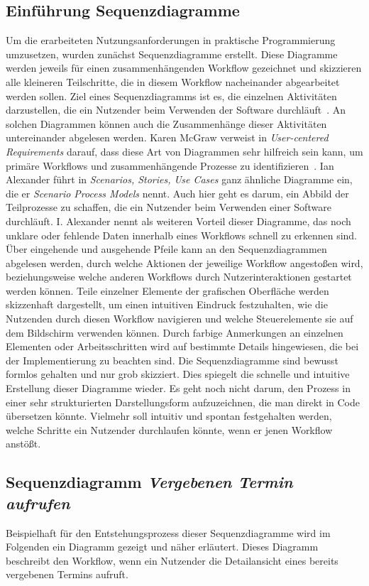 \subsection*{Einführung Sequenzdiagramme}
Um die erarbeiteten Nutzungsanforderungen in praktische Programmierung
umzusetzen, wurden zunächst Sequenzdiagramme erstellt. Diese Diagramme werden
jeweils für einen zusammenhängenden Workflow gezeichnet und skizzieren alle
kleineren Teilschritte, die in diesem Workflow nacheinander abgearbeitet werden
sollen. Ziel eines Sequenzdiagramms ist es, die einzelnen Aktivitäten
darzustellen, die ein Nutzender beim Verwenden der Software
durchläuft~\cite{holtzblattCDEvolved}. An solchen Diagrammen können auch die
Zusammenhänge dieser Aktivitäten untereinander abgelesen werden. Karen McGraw
verweist in \textit{User-centered Requirements} darauf, dass diese Art von
Diagrammen sehr hilfreich sein kann, um primäre Workflows und zusammenhängende
Prozesse zu identifizieren~\cite{sequenceDiagrams}. Ian Alexander führt in
\textit{Scenarios, Stories, Use Cases} ganz ähnliche Diagramme ein, die er
\textit{Scenario Process Models} nennt. Auch hier geht es darum, ein Abbild der
Teilprozesse zu schaffen, die ein Nutzender beim Verwenden einer Software
durchläuft. I. Alexander nennt als weiteren Vorteil dieser Diagramme, das noch
unklare oder fehlende Daten innerhalb eines Workflows schnell zu erkennen sind.
Über eingehende und ausgehende Pfeile kann an den Sequenzdiagrammen abgelesen
werden, durch welche Aktionen der jeweilige Workflow angestoßen wird,
beziehungsweise welche anderen Workflows durch Nutzerinteraktionen gestartet
werden können. Teile einzelner Elemente der grafischen Oberfläche werden
skizzenhaft dargestellt, um einen intuitiven Eindruck festzuhalten, wie die
Nutzenden durch diesen Workflow navigieren und welche Steuerelemente sie auf
dem Bildschirm verwenden können. Durch farbige Anmerkungen an einzelnen
Elementen oder Arbeitsschritten wird auf bestimmte Details hingewiesen, die bei
der Implementierung zu beachten sind. Die Sequenzdiagramme sind bewusst formlos
gehalten und nur grob skizziert. Dies spiegelt die schnelle und intuitive
Erstellung dieser Diagramme wieder. Es geht noch nicht darum, den Prozess in
einer sehr strukturierten Darstellungsform aufzuzeichnen, die man direkt in
Code übersetzen könnte. Vielmehr soll intuitiv und spontan festgehalten werden,
welche Schritte ein Nutzender durchlaufen könnte, wenn er jenen Workflow
anstößt.

\subsection*{Sequenzdiagramm \textit{Vergebenen Termin aufrufen}}
Beispielhaft für den Entstehungsprozess dieser Sequenzdiagramme wird im
Folgenden ein Diagramm gezeigt und näher erläutert. Dieses Diagramm beschreibt
den Workflow, wenn ein Nutzender die Detailansicht eines bereits vergebenen
Termins aufruft.

